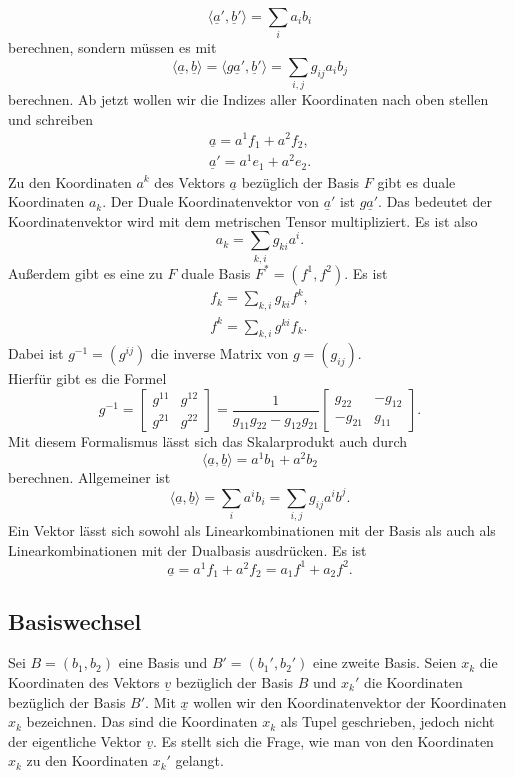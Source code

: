 \documentclass[a4paper,10pt,fleqn,twocolumn,twoside]{article}
\begin{document}
\[\langle\underline a',\underline b'\rangle = \sum_{i}a_ib_i\]
\noindent
berechnen, sondern müssen es mit
\[\langle\underline a,\underline b\rangle
= \langle g\underline a',\underline b'\rangle
= \sum_{i,j} g_{ij}a_ib_j\]
\noindent
berechnen. Ab jetzt wollen wir die Indizes aller Koordinaten
nach oben stellen und schreiben
\begin{gather*}
\underline a = a^1f_1+a^2f_2,\\
\underline a'= a^1e_1+a^2e_2.
\end{gather*}
\noindent
Zu den Koordinaten \(a^k\) des Vektors \(\underline a\) bezüglich der
Basis \(F\) gibt es duale Koordinaten \(a_k\). Der Duale
Koordinatenvektor von \(\underline a'\) ist \(g\underline a'\).
Das bedeutet der Koordinatenvektor wird mit dem metrischen Tensor
multipliziert. Es ist also
\[a_k = \sum_{k,i}g_{ki}a^i.\]
\noindent
Außerdem gibt es eine zu \(F\) duale Basis \(F^\ast=(f^1,f^2)\).
Es ist
\begin{gather*}
f_k = \sum_{k,i}g_{ki}f^k,\\
f^k = \sum_{k,i}g^{ki}f_k.
\end{gather*}
\noindent
Dabei ist \(g^{-1} = (g^{ij})\) die inverse Matrix von
\(g=(g_{ij})\).\\
Hierfür gibt es die Formel
\[g^{-1} = \begin{bmatrix}
g^{11} & g^{12}\\
g^{21} & g^{22}
\end{bmatrix}
= \frac{1}{g_{11}g_{22}-g_{12}g_{21}}
\begin{bmatrix}
g_{22} & -g_{12}\\
-g_{21} & g_{11}
\end{bmatrix}.\]
\noindent
Mit diesem Formalismus lässt sich das Skalarprodukt auch durch
\[\langle\underline a,\underline b\rangle = a^1b_1+a^2b_2\]
\noindent
berechnen. Allgemeiner ist
\[\langle\underline a,\underline b\rangle
= \sum_{i} a^ib_i = \sum_{i,j}g_{ij}a^ib^j.\]
\noindent
Ein Vektor lässt sich sowohl als Linearkombinationen mit der Basis
als auch als Linearkombinationen mit der Dualbasis ausdrücken. Es ist
\[\underline a = a^1f_1+a^2f_2 = a_1f^1+a_2f^2.\]

\subsection{Basiswechsel}

Sei \(B=(b_1,b_2)\) eine Basis und \(B'=(b_1',b_2')\) eine zweite
Basis. Seien \(x_k\) die Koordinaten des Vektors \(\underline v\)
bezüglich der Basis \(B\) und \(x_k'\) die Koordinaten bezüglich der
Basis \(B'\). Mit \(\underline x\) wollen wir den Koordinatenvektor
der Koordinaten \(x_k\) bezeichnen. Das sind die Koordinaten \(x_k\)
als Tupel geschrieben, jedoch nicht der
eigentliche Vektor \(\underline v\). Es stellt sich die Frage, wie man
von den Koordinaten \(x_k\) zu den Koordinaten \(x_k'\) gelangt.
\end{document}
